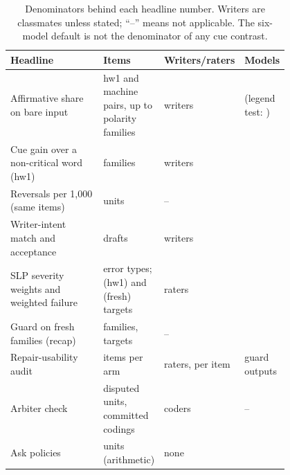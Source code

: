 \begin{table}[t]
\caption{Denominators behind each headline number. Writers are classmates unless stated; ``--'' means not applicable. The six-model default is not the denominator of any cue contrast.}\label{tab:denoms}
\small
\begin{tabular}{@{}p{0.36\linewidth}p{0.20\linewidth}p{0.12\linewidth}p{0.12\linewidth}@{}}
\toprule
Headline & Items & Writers/raters & Models \\
\midrule
Affirmative share on bare input & hw1 and machine pairs, up to \jmhwAffShareFamilies{} polarity families & \jmhwAffShareWriters{} writers & \jmbreadthModels{} (legend test: \jmbreadthOrigModels{}) \\
Cue gain over a non-critical word (hw1) & \jmhwChipGainFamilies{} families & \jmhwChipGainWriters{} writers & \jmbreadthOrigModels{} \\
Reversals per 1,000 (same items) & \jmfOneUnits{} units & -- & \jmfOneModels{} \\
Writer-intent match and acceptance & \jmpOneEightAcceptN{} drafts & \jmpOneEightWriters{} writers & \jmwmModels{} \\
SLP severity weights and weighted failure & \jmslpTypesN{} error types; \jmslpHwN{} (hw1) and \jmslpWcN{} (fresh) targets & \jmdesignSlp{} raters & \jmbreadthOrigModels{} \\
Guard on fresh families (recap) & \jmgtFamilies{} families, \jmgtTargets{} targets & -- & \jmbreadthOrigModels{} \\
Repair-usability audit & \jmpOneSevenItemsPerArm{} items per arm & \jmpOneSevenRaters{} raters, \jmpOneSevenPerItem{} per item & guard outputs \\
Arbiter check & \jmpOneNineArbItems{} disputed units, \jmpOneNineCodings{} committed codings & \jmpOneNinePeople{} coders & -- \\
Ask policies & \jmfOneUnits{} units (arithmetic) & none & \jmfOneModels{} \\
\bottomrule
\end{tabular}
\end{table}

